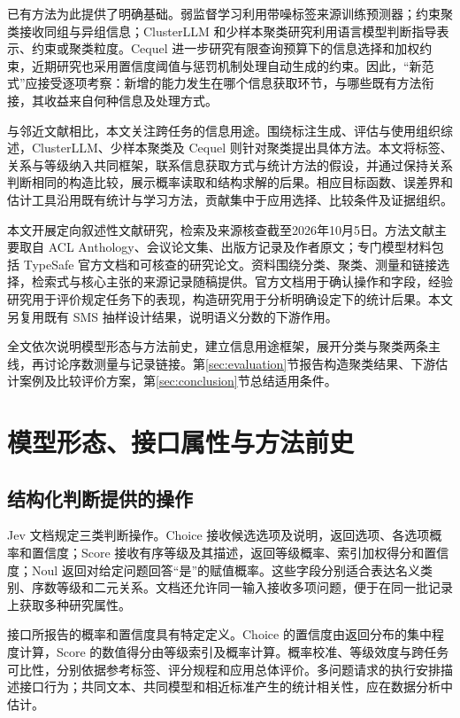 \documentclass[UTF8,a4paper,zihao=-4,fontset=fandol]{ctexart}
\begin{document}
已有方法为此提供了明确基础。弱监督学习利用带噪标签来源训练预测器\citep{ratner2017}；约束聚类接收同组与异组信息\citep{wagstaff2001}；ClusterLLM 和少样本聚类研究利用语言模型判断指导表示、约束或聚类粒度\citep{clusterllm2023,viswanathan2024}。Cequel 进一步研究有限查询预算下的信息选择和加权约束，近期研究也采用置信度阈值与惩罚机制处理自动生成的约束\citep{cequel2025,jia2026}。因此，“新范式”应接受逐项考察：新增的能力发生在哪个信息获取环节，与哪些既有方法衔接，其收益来自何种信息及处理方式。

与邻近文献相比，本文关注跨任务的信息用途。\citet{tan2024}围绕标注生成、评估与使用组织综述，ClusterLLM、少样本聚类及 Cequel 则针对聚类提出具体方法。本文将标签、关系与等级纳入共同框架，联系信息获取方式与统计方法的假设，并通过保持关系判断相同的构造比较，展示概率读取和结构求解的后果。相应目标函数、误差界和估计工具沿用既有统计与学习方法，贡献集中于应用选择、比较条件及证据组织。

本文开展定向叙述性文献研究，检索及来源核查截至2026年10月5日。方法文献主要取自 ACL Anthology、会议论文集、出版方记录及作者原文；专门模型材料包括 TypeSafe 官方文档和可核查的研究论文。资料围绕分类、聚类、测量和链接选择，检索式与核心主张的来源记录随稿提供。官方文档用于确认操作和字段，经验研究用于评价规定任务下的表现，构造研究用于分析明确设定下的统计后果。本文另复用既有 SMS 抽样设计结果，说明语义分数的下游作用。

全文依次说明模型形态与方法前史，建立信息用途框架，展开分类与聚类两条主线，再讨论序数测量与记录链接。第\ref{sec:evaluation}节报告构造聚类结果、下游估计案例及比较评价方案，第\ref{sec:conclusion}节总结适用条件。

\section{模型形态、接口属性与方法前史}\label{sec:history}

\subsection{结构化判断提供的操作}

Jev 文档规定三类判断操作。Choice 接收候选选项及说明，返回选项、各选项概率和置信度；Score 接收有序等级及其描述，返回等级概率、索引加权得分和置信度；Noul 返回对给定问题回答“是”的赋值概率\citep{typesafe-choice,typesafe-score,typesafe-noul}。这些字段分别适合表达名义类别、序数等级和二元关系。文档还允许同一输入接收多项问题\citep{typesafe-intro}，便于在同一批记录上获取多种研究属性。

接口所报告的概率和置信度具有特定定义。Choice 的置信度由返回分布的集中程度计算，Score 的数值得分由等级索引及概率计算\citep{typesafe-choice,typesafe-score}。概率校准、等级效度与跨任务可比性，分别依据参考标签、评分规程和应用总体评价。多问题请求的执行安排描述接口行为；共同文本、共同模型和相近标准产生的统计相关性，应在数据分析中估计。
\end{document}
